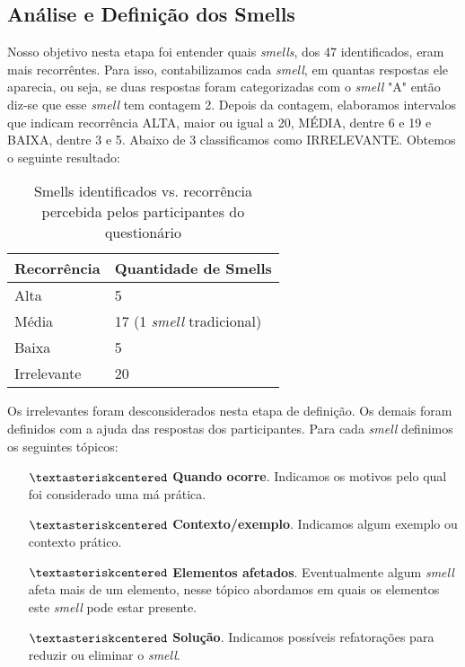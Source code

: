 
\subsection{An\'alise e Defini\c{c}\~ao dos Smells}
\label{sub:analisys-definition}

Nosso objetivo nesta etapa foi entender quais \textit{smells}, dos 47 identificados, eram mais recorr\^entes. Para isso, contabilizamos cada \textit{smell}, em quantas respostas ele aparecia, ou seja, se duas respostas foram categorizadas com o \textit{smell} "A" ent\~ao diz-se que esse \textit{smell} tem contagem 2. Depois da contagem, elaboramos intervalos que indicam recorr\^encia ALTA, maior ou igual a 20, M\'EDIA, dentre 6 e 19 e BAIXA, dentre 3 e 5. Abaixo de 3 classificamos como IRRELEVANTE. Obtemos o seguinte resultado:

\begin{table}[h]
\centering
\caption{Smells identificados vs. recorr\^encia percebida pelos participantes do question\'ario}
\small
\begin{tabular}{p{3cm}|p{4cm}}
\toprule
\textbf{Recorr\^encia} & \textbf{Quantidade de Smells} \\
\hline
Alta  			& 5 \\
M\'edia 		& 17 (1 \textit{smell} tradicional) \\
Baixa			& 5 \\
Irrelevante 	& 20 \\
\toprule
\end{tabular}
\label{tab:DadosDemograficos2}
\end{table}

Os irrelevantes foram desconsiderados nesta etapa de defini\c{c}\~ao. Os demais foram definidos com a ajuda das respostas dos participantes. Para cada \textit{smell} definimos os seguintes t\'opicos: 

\begin{itemize} 
	\item[$\textasteriskcentered$] \textbf{Quando ocorre}. Indicamos os motivos pelo qual foi considerado uma m\'a pr\'atica.   
	\item[$\textasteriskcentered$] \textbf{Contexto/exemplo}. Indicamos algum exemplo ou contexto pr\'atico. 
	\item[$\textasteriskcentered$] \textbf{Elementos afetados}. Eventualmente algum \textit{smell} afeta mais de um elemento, nesse t\'opico abordamos em quais os elementos este \textit{smell} pode estar presente. 
	\item[$\textasteriskcentered$] \textbf{Solu\c{c}\~ao}. Indicamos poss\'iveis refatora\c{c}\~oes para reduzir ou eliminar o \textit{smell}. \\
\end{itemize}

